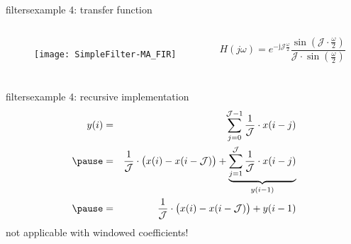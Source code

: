 	\begin{frame}{filters}{example 4: transfer function}
        \vspace{-10mm}
        \begin{columns}
		\begin{figure}
			\centerline{\texttt{[image: SimpleFilter-MA\_FIR]}}
		\end{figure}
    	\begin{equation*}
    		H(j\omega) = e^{-\mathrm{j}\mathcal{J}\frac{\omega}{2}}\frac{\sin\left(\mathcal{J}\cdot\frac{\omega}{2} \right)}{\mathcal{J}\cdot\sin\left(\frac{\omega}{2} \right)}
    	\end{equation*}
        \end{columns}

	\end{frame}	
	\begin{frame}{filters}{example 4: recursive implementation}
		\begin{eqnarray*}
			y(i) &=& \sum\limits_{j=0}^{\mathcal{J}-1}{\frac{1}{\mathcal{J}}\cdot x(i-j)}\nonumber\\
			\pause
			&=& \frac{1}{\mathcal{J}}\cdot \big(x(i) - x(i-\mathcal{J})\big) + \underbrace{\sum\limits_{j=1}^{\mathcal{J}}{\frac{1}{\mathcal{J}}\cdot x(i-j)}}_{y(i-1)}\nonumber\\
			\pause
			&=& \frac{1}{\mathcal{J}}\cdot \big(x(i) - x(i-\mathcal{J})\big) + y(i-1) 
		\end{eqnarray*} 
		\pause
		\textcolor{gtgold}{not applicable with windowed coefficients!}
	\end{frame}

